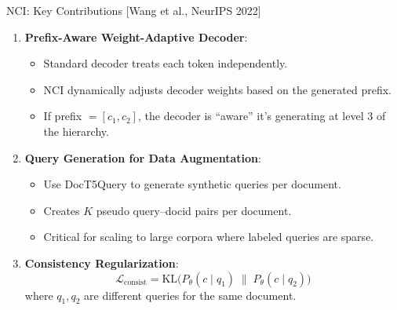 \documentclass[aspectratio=169,11pt]{beamer}
\begin{document}
\begin{frame}{NCI: Key Contributions [Wang et al., NeurIPS 2022]}
\begin{enumerate}
    \item \textbf{Prefix-Aware Weight-Adaptive Decoder}:
    \begin{itemize}
        \item Standard decoder treats each token independently.
        \item NCI dynamically adjusts decoder weights based on the generated prefix.
        \item If prefix $= [c_1, c_2]$, the decoder is ``aware'' it's generating at level 3 of the hierarchy.
    \end{itemize}

    \vspace{0.3cm}
    \item \textbf{Query Generation for Data Augmentation}:
    \begin{itemize}
        \item Use DocT5Query to generate synthetic queries per document.
        \item Creates $K$ pseudo query--docid pairs per document.
        \item Critical for scaling to large corpora where labeled queries are sparse.
    \end{itemize}

    \vspace{0.3cm}
    \item \textbf{Consistency Regularization}:
    \[
    \mathcal{L}_{\text{consist}} = \text{KL}\bigl(P_\theta(c \mid q_1) \;\|\; P_\theta(c \mid q_2)\bigr)
    \]
    where $q_1, q_2$ are different queries for the same document.
\end{enumerate}
\end{frame}

\end{document}
